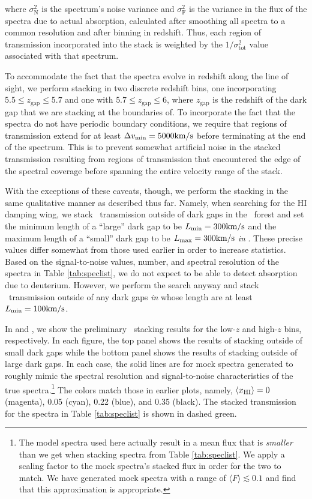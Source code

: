 where $\sigma_{\text{N}}^{2}$ is the spectrum's noise variance and $\sigma_{\text{F}}^{2}$ is the variance in the flux of the spectra due to actual absorption, calculated after smoothing all spectra to a common resolution and after binning in redshift. Thus, each region of transmission incorporated into the stack is weighted by the $1/\sigma_{\text{tot}}^{2}$ value associated with that spectrum. 

To accommodate the fact that the spectra evolve in redshift along the line of sight, we perform stacking in two discrete redshift bins, one incorporating $5.5 \leq z_{\text{gap}} \leq 5.7$ and one with $5.7 \leq z_{\text{gap}} \leq 6$, where $z_{\text{gap}}$ is the redshift of the dark gap that we are stacking at the boundaries of. To incorporate the fact that the spectra do not have periodic boundary conditions, we require that regions of transmission extend for at least $\Delta v_{\text{min}} = 5000\text{km}/\text{s}$ before terminating at the end of the spectrum. This is to prevent somewhat artificial noise in the stacked transmission resulting from regions of transmission that encountered the edge of the spectral coverage before spanning the entire velocity range of the stack. 


With the exceptions of these caveats, though, we perform the stacking in the same qualitative manner as described thus far. Namely, when searching for the HI damping wing, we stack \lya\ transmission outside of dark gaps in the \lyb\ forest and set the minimum length of a ``large'' dark gap to be $L_{\text{min}} = 300\text{km}/\text{s}$ and the maximum length of a ``small'' dark gap to be $L_{\text{max}} = 300\text{km}/\text{s}$ \textit{in \lyb}. These precise values differ somewhat from those used earlier in order to increase statistics. Based on the signal-to-noise values, number, and spectral resolution of the spectra in Table \ref{tab:speclist}, we do not expect to be able to detect absorption due to deuterium. However, we perform the search anyway and stack \lyb\ transmission outside of any dark gaps \textit{in \lyb} whose length are at least $L_{\text{min}} = 100\text{km}/\text{s}$. 


In  and , we show the preliminary \lya\ stacking results for the low-$z$ and high-$z$ bins, respectively. In each figure, the top panel shows the results of stacking outside of small dark gaps while the bottom panel shows the results of stacking outside of large dark gaps. In each case, the solid lines are for mock spectra generated to roughly mimic the spectral resolution and signal-to-noise characteristics of the true spectra.\footnote{The model spectra used here actually result in a mean flux that is \textit{smaller} than we get when stacking spectra from Table \ref{tab:speclist}. We apply a scaling factor to the mock spectra's stacked flux in order for the two to match. We have generated mock spectra with a range of $\langle F \rangle \lesssim 0.1$ and find that this approximation is appropriate.} The colors match those in earlier plots, namely, $\langle x_{\text{HI}}\rangle = 0$ (magenta), 0.05 (cyan), 0.22 (blue), and 0.35 (black). The stacked transmission for the spectra in Table \ref{tab:speclist} is shown in dashed green.



